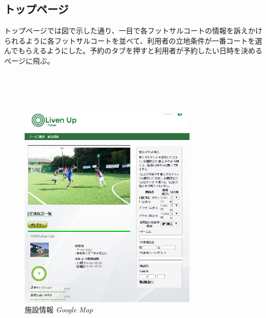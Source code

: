 \subsection{トップページ}
トップページでは図で示した通り、一目で各フットサルコートの情報を訴えかけられるように各フットサルコートを並べて、利用者の立地条件が一番コートを選んでもらえるようにした。予約のタブを押すと利用者が予約したい日時を決めるページに飛ぶ。
\\
\\
\\
\\
\\
\begin{figure}[htbp]
	\centering
	\includegraphics[width=85mm, bb=10 0 500 300]{figures/top.jpg}
	\caption{施設情報 {\itshape Google Map}}
	\label{施設情報}
\end{figure}

\newpage

